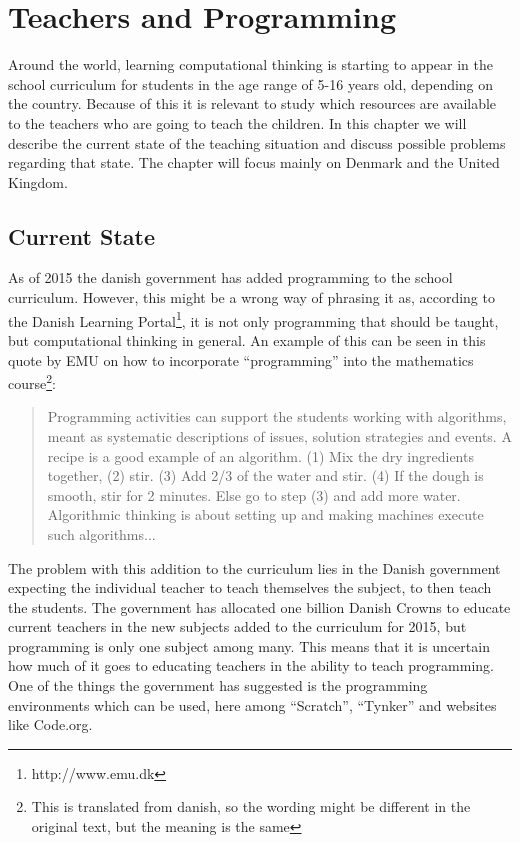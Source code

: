 \chapter{Teachers and Programming}
\label{chap:teaching}
Around the world, learning computational thinking is starting to appear in the school curriculum for students in the age range of 5-16 years old, depending on the country. Because of this it is relevant to study which resources are available to the teachers who are going to teach the children. In this chapter we will describe the current state of the teaching situation and discuss possible problems regarding that state. The chapter will focus mainly on Denmark and the United Kingdom.

\section{Current State}
As of 2015 the danish government has added programming to the school curriculum. However, this might be a wrong way of phrasing it as, according to the Danish Learning Portal\footnote{http://www.emu.dk}, it is not only programming that should be taught, but computational thinking in general. An example of this can be seen in this quote by EMU on how to incorporate ``programming'' into the mathematics course\footnote{This is translated from danish, so the wording might be different in the original text, but the meaning is the same}:
\begin{quote}
Programming activities can support the students working with algorithms, meant as systematic descriptions of issues, solution strategies and events. A recipe is a good example of an algorithm. (1) Mix the dry ingredients together, (2) stir. (3) Add 2/3 of the water and stir. (4) If the dough is smooth, stir for 2 minutes. Else go to step (3) and add more water. Algorithmic thinking is about setting up and making machines execute such algorithms...\cite{dk_scratch}
\end{quote}

The problem with this addition to the curriculum lies in the Danish government expecting the individual teacher to teach themselves the subject, to then teach the students. The government has allocated one billion Danish Crowns to educate current teachers in the new subjects added to the curriculum for 2015, but programming is only one subject among many. This means that it is uncertain how much of it goes to educating teachers in the ability to teach programming. One of the things the government has suggested is the programming environments which can be used, here among ``Scratch'', ``Tynker'' and websites like Code.org.

